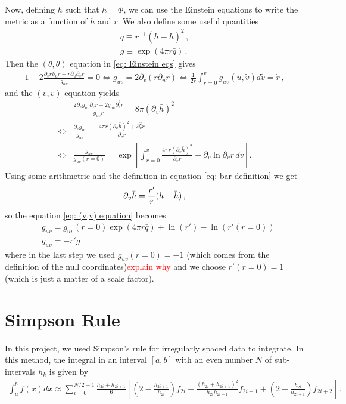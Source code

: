 \documentclass[11pt]{article}
\begin{document}
Now, defining $h$ such that $\bar h = \Phi$, we can use the Einstein equations to write the metric as a function of $h$ and $r$. We also define some useful quantities
\begin{gather}
    q \equiv r^{-1}(h-\bar h)^2 \, ,\\
    g \equiv \exp{(4\pi r \bar q)} \, .
\end{gather}
Then the $(\theta,\theta)$ equation in \eqref{eq: Einstein eqs} gives
\begin{align}
    1- 2\frac{\partial_v r\partial_u r + r \partial_u\partial_v r}{g_{uv}} = 0 \Leftrightarrow
    g_{uv} = 2 \partial_v (r \partial_u r) \Leftrightarrow 
    \frac{1}{2r}\int_{r=0}^v g_{uv}(u,\tilde{v}) d\tilde{v} = \dot r \, ,
\end{align}
and the $(v,v)$ equation yields
\begin{align}
    &\frac{2 \partial_v g_{uv}\partial_v r - 2g_{uv}\partial_v^2 r}{g_{uv}r} = 8\pi(\partial_v \bar h)^2 \\
    \Leftrightarrow
    &\frac{\partial_v g_{uv}}{g_{uv}} = \frac{4\pi r (\partial_v \bar h)^2 + \partial_v^2 r}{\partial_v r} \,\\
     \Leftrightarrow
    &\frac{g_{uv}}{g_{uv}(r=0)} = \exp{\left[\int_{r=0}^v \frac{4\pi r (\partial_v \bar h)^2}{\partial_v r} + \partial_v \ln{\partial_v r}\,d\tilde{v}\right]} .\label{eq: (v,v) equation}
\end{align}
Using some arithmetric and the definition in equation \eqref{eq: bar definition} we get
\begin{align}
    \partial_v \Bar{h} = \frac{r'}{r}(h-\Bar{h}) \, ,
\end{align}
so the equation \eqref{eq: (v,v) equation} becomes 
\begin{align}
    &g_{uv} = g_{uv}(r=0)\exp{(4\pi r \bar{q}) + \ln{(r')} - \ln{(r'(r=0))}}\\
    &g_{uv}= - r'g
\end{align}
where in the last step we used $g_{uv}(r=0) = -1$ (which comes from the definition of the null coordinates)\textcolor{red}{explain why} and we choose $r'(r=0) = 1$ (which is just a matter of a scale factor).

\section{Simpson Rule}

In this project, we used Simpson's rule for irregularly spaced data to integrate. In this method, the integral in an interval $[a,b]$ with an even number $N$ of sub-intervals $h_k$ is given by
\begin{align}
    \int_a^b f(x) dx\approx\sum_{i=0}^{N/2-1}\frac{h_{2i}+h_{2i+1}}{6}\left[\left(2-\frac{h_{2i+1}}{h_{2i}}\right)f_{2i}+\frac{(h_{2i}+h_{2i+1})^2}{h_{2i}h_{2i+1}}f_{2i+1}+\left(2-\frac{h_{2i}}{h_{2i+1}}\right)f_{2i+2}\right] \, .
    \label{eq: simpson rule}
\end{align}
\end{document}
